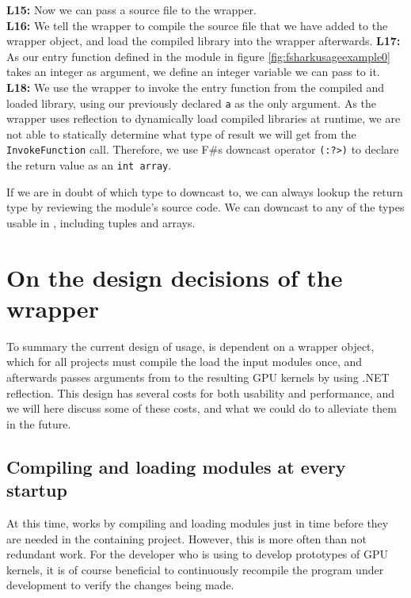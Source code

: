 \textbf{L15:} Now we can pass a source file to the \fshark{} wrapper. \\
\textbf{L16:} We tell the wrapper to compile the source file that we have added
to the wrapper object, and load the compiled library into the wrapper
afterwards.
\textbf{L17:} As our entry function defined in the module in figure
\ref{fig:fsharkusageexample0} takes an integer as argument, we define an integer
variable we can pass to it.
\textbf{L18:} We use the wrapper to invoke the entry function from the compiled
and loaded library, using our previously declared \texttt{a} as the only
argument. As the \fshark{} wrapper uses reflection to dynamically load compiled
libraries at runtime, we are not able to statically determine what type of
result we will get from the \texttt{InvokeFunction} call. Therefore, we use F\#s
downcast operator \texttt{(:?>)} to declare the return value as an \texttt{int
  array}.

If we are in doubt of which type to downcast to, we can always lookup the return
type by reviewing the \fshark{} module's source code. We can downcast to any of
the types usable in \fsharp{}, including tuples and arrays.

\section{On the design decisions of the \fshark{} wrapper}
To summary the current design of \fshark{} usage, \fshark{} is dependent on a
wrapper object, which for all \fshark{} projects must compile the load the input
\fshark{} modules once, and afterwards passes arguments from \fsharp{} to the
resulting GPU kernels by using .NET reflection.
This design has several costs for both usability and performance, and we will
here discuss some of these costs, and what we could do to alleviate them in the
future.

\subsection{Compiling and loading \fshark{} modules at every startup}
At this time, \fshark{} works by compiling and loading \fshark{} modules just in
time before they are needed in the containing \fsharp{} project. However, this
is more often than not redundant work. For the developer who is using \fshark{} to develop
prototypes of \fshark{} GPU kernels, it is of course beneficial to continuously
recompile the \fshark{} program under development to verify the changes being
made.

